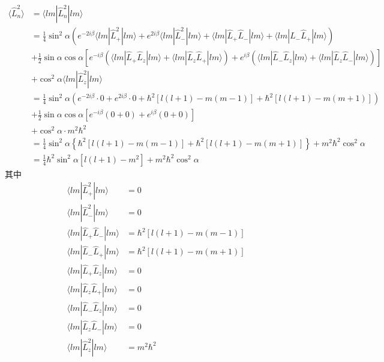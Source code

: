 \begin{equation}
    \begin{aligned}
        \langle \hat{L}_{n}^{2}\rangle &=\langle lm|\hat{L}_{n}^{2}|lm\rangle 
\\
&=\frac{1}{4}\sin ^2\alpha \left( e^{-2i\beta}\langle lm|\hat{L}_{+}^{2}|lm\rangle +e^{2i\beta}\langle lm|\hat{L}_{-}^{2}|lm\rangle +\langle lm|\hat{L}_+\hat{L}_-|lm\rangle +\langle lm|\hat{L}_-\hat{L}_+|lm\rangle \right) 
\\
&+\frac{1}{2}\sin \alpha \cos \alpha \left[ e^{-i\beta}\left( \langle lm|\hat{L}_+\hat{L}_z|lm\rangle +\langle lm|\hat{L}_z\hat{L}_+|lm\rangle \right) +e^{i\beta}\left( \langle lm|\hat{L}_-\hat{L}_z|lm\rangle +\langle lm|\hat{L}_z\hat{L}_-|lm\rangle \right) \right] 
\\
&+\cos ^2\alpha \langle lm|\hat{L}_{z}^{2}|lm\rangle 
\\
&=\frac{1}{4}\sin ^2\alpha \left( e^{-2i\beta}\cdot 0+e^{2i\beta}\cdot 0+\hbar ^2\left[ l\left( l+1 \right) -m\left( m-1 \right) \right] +\hbar ^2\left[ l\left( l+1 \right) -m\left( m+1 \right) \right] \right) 
\\
&+\frac{1}{2}\sin \alpha \cos \alpha \left[ e^{-i\beta}\left( 0+0 \right) +e^{i\beta}\left( 0+0 \right) \right] 
\\
&+\cos ^2\alpha \cdot m^2\hbar ^2
\\
&=\frac{1}{4}\sin ^2\alpha \left\{ \hbar ^2\left[ l\left( l+1 \right) -m\left( m-1 \right) \right] +\hbar ^2\left[ l\left( l+1 \right) -m\left( m+1 \right) \right] \right\} +m^2\hbar ^2\cos ^2\alpha 
\\
&=\frac{1}{4}\hbar ^2\sin ^2\alpha \left[ l\left( l+1 \right) -m^2 \right] +m^2\hbar ^2\cos ^2\alpha 
    \end{aligned}
\end{equation}
其中
\begin{equation}
    \begin{aligned}
        \langle lm|\hat{L}_{+}^{2}|lm\rangle &=0
\\
\langle lm|\hat{L}_{-}^{2}|lm\rangle &=0
\\
\langle lm|\hat{L}_+\hat{L}_-|lm\rangle &=\hbar ^2\left[ l\left( l+1 \right) -m\left( m-1 \right) \right] 
\\
\langle lm|\hat{L}_-\hat{L}_+|lm\rangle &=\hbar ^2\left[ l\left( l+1 \right) -m\left( m+1 \right) \right] 
\\
\langle lm|\hat{L}_+\hat{L}_z|lm\rangle &=0
\\
\langle lm|\hat{L}_z\hat{L}_+|lm\rangle &=0
\\
\langle lm|\hat{L}_-\hat{L}_z|lm\rangle &=0
\\
\langle lm|\hat{L}_z\hat{L}_-|lm\rangle &=0
\\
\langle lm|\hat{L}_{z}^{2}|lm\rangle &=m^2\hbar ^2
    \end{aligned}
\end{equation}

